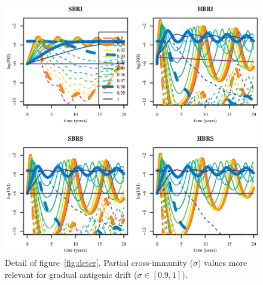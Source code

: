 \begin{figure}[!htbp]
\begin{center}
	\includegraphics[]{graphs/article1/figure_3.eps}
\end{center}
        \caption{ Detail of figure~\ref{fig:deter}. Partial
          cross-immunity ($\sigma$) values more relevant for gradual
          antigenic drift ($\sigma \in [0.9,1]$).}
	\label{fig:deter_rescaled}
\end{figure}



